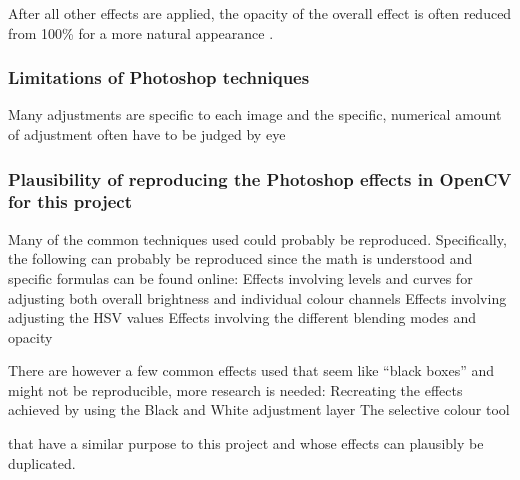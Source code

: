 After all other effects are applied, the opacity of the overall effect is often reduced from 100\% for a more natural appearance \cite{photoshop:obama} \cite{photoshop:match_body}.

\subsubsection*{Limitations of Photoshop techniques}
Many adjustments are specific to each image and the specific, numerical amount of adjustment often have to be judged by eye

\subsubsection*{Plausibility of reproducing the Photoshop effects in OpenCV for this project}
Many of the common techniques used could probably be reproduced. Specifically, the following can probably be reproduced since the math is understood and specific formulas can be found online: 
Effects involving levels and curves for adjusting both overall brightness and individual colour channels
Effects involving adjusting the HSV values
Effects involving the different blending modes and opacity 

There are however a few common effects used that seem like “black boxes” and might not be reproducible, more research is needed:
Recreating the effects achieved by using the Black and White adjustment layer
The selective colour tool

that have a similar purpose to this project and whose effects can plausibly be duplicated.
